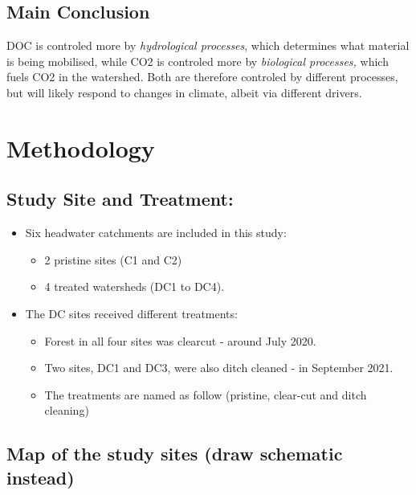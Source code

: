 \documentclass[
]{article}
\begin{document}
\subsection{Main Conclusion}\label{main-conclusion}

DOC is controled more by \emph{hydrological processes}, which determines
what material is being mobilised, while CO2 is controled more by
\emph{biological processes,} which fuels CO2 in the watershed. Both are
therefore controled by different processes, but will likely respond to
changes in climate, albeit via different drivers.

\section{Methodology}\label{methodology}

\subsection{Study Site and Treatment:}\label{study-site-and-treatment}

\begin{itemize}
\item
  Six headwater catchments are included in this study:

  \begin{itemize}
  \item
    2 pristine sites (C1 and C2)
  \item
    4 treated watersheds (DC1 to DC4).
  \end{itemize}
\item
  The DC sites received different treatments:

  \begin{itemize}
  \item
    Forest in all four sites was clearcut - around July 2020.
  \item
    Two sites, DC1 and DC3, were also ditch cleaned - in September 2021.
  \item
    The treatments are named as follow (pristine, clear-cut and ditch
    cleaning)
  \end{itemize}
\end{itemize}

\subsection{Map of the study sites (draw schematic
instead)}\label{map-of-the-study-sites-draw-schematic-instead}
\end{document}
